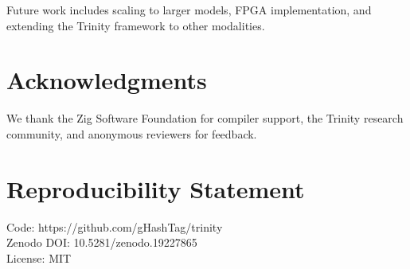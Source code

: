 \documentclass{article}
\begin{document}
Future work includes scaling to larger models, FPGA implementation, and extending the Trinity framework to other modalities.

\section*{Acknowledgments}

We thank the Zig Software Foundation for compiler support, the Trinity research community, and anonymous reviewers for feedback.

\section*{Reproducibility Statement}

Code: https://github.com/gHashTag/trinity \\
Zenodo DOI: 10.5281/zenodo.19227865 \\
License: MIT



\end{document}
